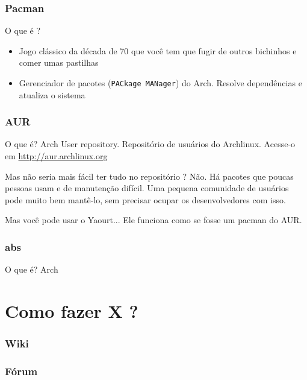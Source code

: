 \documentclass{beamer}
\begin{document}
\begin{frame}[fragile]
        \frametitle{Pacman}
        \begin{block}{O que é ?}
                \begin{itemize}
                    \item Jogo clássico da década de 70 que você tem que fugir de outros bichinhos e comer umas pastilhas
                    \item Gerenciador de pacotes (\verb#PACkage MANager#) do Arch. Resolve dependências e atualiza o sistema
            \end{itemize}
        \end{block}
\end{frame}

\begin{frame}
    \frametitle{AUR}
    \begin{block}{O que é?}
            Arch User repository. Repositório de usuários do Archlinux. Acesse-o em \url{http://aur.archlinux.org}
    \end{block}
    \begin{block}{Mas não seria mais fácil ter tudo no repositório ?}
            Não. Há pacotes que poucas pessoas usam e de manutenção difícil. Uma pequena comunidade de usuários
            pode muito bem mantê-lo, sem precisar ocupar os desenvolvedores com isso.
    \end{block}
    \begin{block}{Mas você pode usar o Yaourt...}
        Ele funciona como se fosse um pacman do AUR.
    \end{block}
\end{frame}

\begin{frame}
    \frametitle{abs}
    \begin{block}{O que é?}
        Arch 
    \end{block}

\end{frame}

\section{Como fazer X ? }

\begin{frame}
    \frametitle{Wiki}
\end{frame}

\begin{frame}
    \frametitle{Fórum}
\end{frame}
\end{document}
